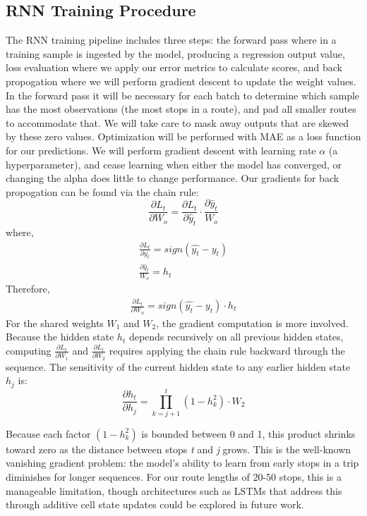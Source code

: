 \documentclass[sigconf]{acmart}
\begin{document}
\subsection{RNN Training Procedure}
The RNN training pipeline includes three steps: the forward pass where in a training sample is ingested by the model, producing a regression output value, loss evaluation where we apply our error metrics to calculate scores, and back propogation where we will perform gradient descent to update the weight values.\\
In the forward pass it will be necessary for each batch to determine which sample has the most observations (the most stops in a route), and pad all smaller routes to accommodate that. We will take care to mask away outputs that are skewed by these zero values.
Optimization will be performed with MAE as a loss function for our predictions. We will perform gradient descent with learning rate $\alpha$ (a hyperparameter), and cease learning when either the model has converged, or changing the alpha does little to change performance. Our gradients for back propogation can be found via the chain rule:
$$\frac{\partial L_t}{\partial W_o} = \frac{\partial L_t}{\partial \hat{y}_t} \cdot \frac{\partial \hat{y}_t}{W_o}$$
where,
\begin{align*}
    \frac{\partial L_t}{\partial \hat{ y_t}} = sign(\hat{y_t} - y_t) \tag{MAE gradient}\\
    \frac{\partial \hat{y}_t}{W_o} = h_t \tag{gradient of linear function}
\end{align*}
Therefore,
\begin{align*}
   \frac{\partial L_t}{\partial W_o} =  sign(\hat{y_t} - y_t) \cdot h_t
\end{align*}
For the shared weights $W_1$ and $W_2$, the gradient computation is more involved. Because the hidden state $h_t$ depends recursively on all previous hidden states, computing $\frac{\partial L_t}{\partial W_1}$ and $\frac{\partial L_t}{\partial W_2}$ requires applying the chain rule backward through the sequence. The sensitivity of the current hidden state to any earlier hidden state $h_j$ is:
$$\frac{\partial h_t}{\partial h_j} = \prod_{k=j+1}^t (1-h_k^2) \cdot W_2$$

Because each factor $(1-h_k^2)$ is bounded between 0 and 1, this product shrinks toward zero as the distance between stops \textit{t} and \textit{j} grows. This is the well-known vanishing gradient problem: the model's ability to learn from early stops in a trip diminishes for longer sequences. For our route lengths of 20-50 stops, this is a manageable limitation, though architectures such as LSTMs that address this through additive cell state updates could be explored in future work.
\end{document}
